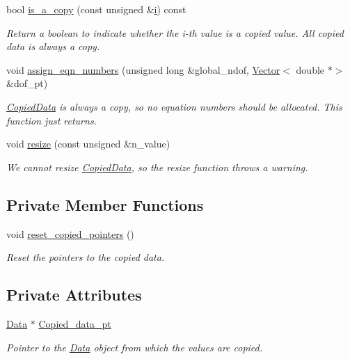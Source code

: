 \begin{DoxyCompactItemize}
bool \hyperlink{classoomph_1_1CopiedData_a80b677702e0cb94c5356214f5cf9f9fb}{is\+\_\+a\+\_\+copy} (const unsigned \&\hyperlink{cfortran_8h_adb50e893b86b3e55e751a42eab3cba82}{i}) const
\begin{DoxyCompactList}\small\item\em Return a boolean to indicate whether the i-\/th value is a copied value. All copied data is always a copy. \end{DoxyCompactList}\item 
void \hyperlink{classoomph_1_1CopiedData_a41e228dd49d078dd35520992d57f0f5f}{assign\+\_\+eqn\+\_\+numbers} (unsigned long \&global\+\_\+ndof, \hyperlink{classoomph_1_1Vector}{Vector}$<$ double $\ast$$>$ \&dof\+\_\+pt)
\begin{DoxyCompactList}\small\item\em \hyperlink{classoomph_1_1CopiedData}{Copied\+Data} is always a copy, so no equation numbers should be allocated. This function just returns. \end{DoxyCompactList}\item 
void \hyperlink{classoomph_1_1CopiedData_aa7c48fb5ea17cd42260965bf2c800b3d}{resize} (const unsigned \&n\+\_\+value)
\begin{DoxyCompactList}\small\item\em We cannot resize \hyperlink{classoomph_1_1CopiedData}{Copied\+Data}, so the resize function throws a warning. \end{DoxyCompactList}\end{DoxyCompactItemize}
\subsection*{Private Member Functions}
\begin{DoxyCompactItemize}
\item 
void \hyperlink{classoomph_1_1CopiedData_a7e29b2bb1cf0ebad16afac2e5d7342d8}{reset\+\_\+copied\+\_\+pointers} ()
\begin{DoxyCompactList}\small\item\em Reset the pointers to the copied data. \end{DoxyCompactList}\end{DoxyCompactItemize}
\subsection*{Private Attributes}
\begin{DoxyCompactItemize}
\item 
\hyperlink{classoomph_1_1Data}{Data} $\ast$ \hyperlink{classoomph_1_1CopiedData_a592934e0ca9ade33ed91a7f74c091864}{Copied\+\_\+data\+\_\+pt}
\begin{DoxyCompactList}\small\item\em Pointer to the \hyperlink{classoomph_1_1Data}{Data} object from which the values are copied. \end{DoxyCompactList}\end{DoxyCompactItemize}
